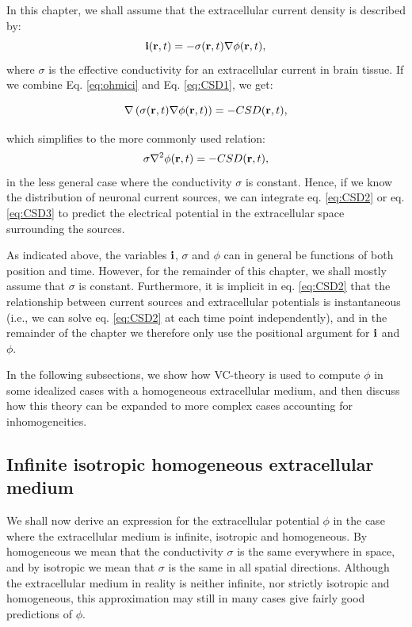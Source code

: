 In this chapter, we shall assume that the extracellular current density is described by:
\begin{equation}
{\bf i}({\bf r}, t) = - \sigma({\bf r}, t) \nabla \phi({\bf r}, t),
\label{eq:ohmici}
\end{equation}
where $\sigma$ is the effective conductivity for an extracellular current in brain tissue. If we combine Eq. \ref{eq:ohmici} and Eq. \ref{eq:CSD1}, we get:

\begin{equation}
\nabla \left( \sigma({\bf r}, t) \nabla \phi({\bf r}, t) \right) = - CSD({\bf r}, t),
\label{eq:CSD2}
\end{equation}

which simplifies to the more commonly used relation:
\begin{equation}
\sigma \nabla^2\phi({\bf r}, t) = - CSD({\bf r}, t),
\label{eq:CSD3}
\end{equation}
in the less general case where the conductivity $\sigma$ is constant. Hence, if we know the distribution of neuronal current sources, we can integrate eq. \ref{eq:CSD2} or eq. \ref{eq:CSD3} to predict the electrical potential in the extracellular space surrounding the sources. 

As indicated above, the variables ${\bf i}$, $\sigma$ and $\phi$ can in general be functions of both position and time. However, for the remainder of this chapter, we shall mostly assume that $\sigma$ is constant. Furthermore, it is implicit in eq. \ref{eq:CSD2} that the relationship between current sources and extracellular potentials is instantaneous (i.e., we can solve eq.  \ref{eq:CSD2} at each time point independently), and in the remainder of the chapter we therefore only use the positional argument for ${\bf i}$ and $\phi$. 

In the following subsections, we show how VC-theory is used to compute $\phi$ in some idealized cases with a homogeneous extracellular medium, and then discuss how this theory can be expanded to more complex cases accounting for inhomogeneities. 


\subsection{Infinite isotropic homogeneous extracellular medium}
\label{sec:isohomo}
We shall now derive an expression for the extracellular potential $\phi$ in the case where the extracellular medium is infinite, isotropic and homogeneous. By homogeneous we mean that the conductivity $\sigma$ is the same everywhere in space, and by isotropic we mean that $\sigma$ is the same in all spatial directions. Although the extracellular medium in reality is neither infinite, nor strictly isotropic and homogeneous, this approximation may still in many cases give fairly good predictions of $\phi$.


